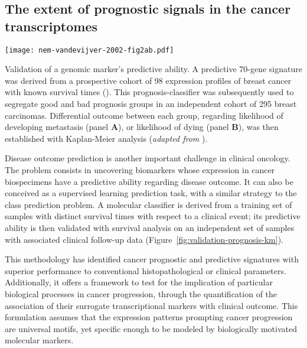 \subsection{The extent of prognostic signals in the cancer transcriptomes}
\label{sec:discussion-prognostic-microarrays}

\begin{marginfigure}%
  \texttt{[image: nem-vandevijver-2002-fig2ab.pdf]}
  \caption[Validation of a genomic marker's predictive ability]{Validation of a
    genomic marker's predictive ability.  A predictive 70-gene signature was
    derived from a prospective cohort of 98 expression profiles of breast cancer
    with known survival times (\citealp{vant_veer_gene_2002}).  This
    prognosis-classifier was subsequently used to segregate good and bad
    prognosis groups in an independent cohort of 295 breast
    carcinomas. Differential outcome between each group, regarding likelihood of
    developing metastasis (panel \textbf{A}), or likelihood of dying (panel
    \textbf{B}), was then established with Kaplan-Meier analysis (\emph{adapted
      from} \citealp{van_de_vijver_gene-expression_2002}).}
  \label{fig:validation-prognosis-km}%
\end{marginfigure}

Disease outcome prediction is another important challenge in clinical
oncology.\cite{van_de_vijver_gene-expression_2002,vasselli_predicting_2003,sanchez-carbayo_defining_2006}
The problem consists in uncovering biomarkers whose expression in cancer
biospecimens have a predictive ability regarding disease outcome.  It can also
be conceived as a supervised learning prediction task, with a similar strategy
to the class prediction problem.  A molecular classifier is derived from a
training set of samples with distinct survival times with respect to a clinical
event; its predictive ability is then validated with survival analysis on an
independent set of samples with associated clinical follow-up data
(Figure~\ref{fig:validation-prognosis-km}).

This methodology has identified cancer prognostic and predictive signatures with
superior performance to conventional histopathological or clinical
parameters.\cite{sole_biological_2009} Additionally, it offers a framework to
test for the implication of particular biological processes in cancer
progression, through the quantification of the association of their surrogate
transcriptional markers with clinical outcome.\cite{chang_gene_2004} This
formulation assumes that the expression patterns prompting cancer progression
are universal motifs, yet specific enough to be modeled by biologically
motivated molecular markers.

